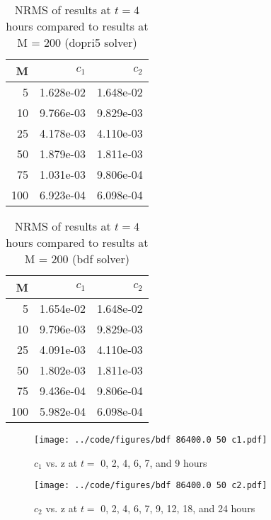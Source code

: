 \documentclass[twocolumn,10pt]{asme2ej}
\begin{document}
\begin{table}[tbh]
\begin{center}
\begin{tabular}{| r | r r |}
\hline
M & $c_{1}$ & $c_{2}$ \\
\hline
  5 & 1.628e-02 & 1.648e-02 \\
 10 & 9.766e-03 & 9.829e-03 \\
 25 & 4.178e-03 & 4.110e-03 \\
 50 & 1.879e-03 & 1.811e-03 \\
 75 & 1.031e-03 & 9.806e-04 \\
100 & 6.923e-04 & 6.098e-04 \\
\hline
\end{tabular}
\caption{NRMS of results at $t=4$ hours compared to results at M = 200 (dopri5 solver)}
\label{dopri5_nrms_table}
\end{center}
\end{table}

\begin{table}[tbh]
\begin{center}
\begin{tabular}{| r | r r |}
\hline
M & $c_{1}$ & $c_{2}$ \\
\hline
  5 & 1.654e-02 & 1.648e-02 \\
 10 & 9.796e-03 & 9.829e-03 \\
 25 & 4.091e-03 & 4.110e-03 \\
 50 & 1.802e-03 & 1.811e-03 \\
 75 & 9.436e-04 & 9.806e-04 \\
100 & 5.982e-04 & 6.098e-04 \\
\hline
\end{tabular}
\caption{NRMS of results at $t=4$ hours compared to results at M = 200 (bdf solver)}
\label{bdf_nrms_table}
\end{center}
\end{table}

\begin{figure}[thb]
\begin{center}
\texttt{[image: ../code/figures/bdf 86400.0 50 c1.pdf]}
\caption{$c_1$ vs. z at $t = $ 0, 2, 4, 6, 7, and 9 hours}
\label{c1_plot}
\end{center}
\end{figure}

\begin{figure}[thb]
\begin{center}
\texttt{[image: ../code/figures/bdf 86400.0 50 c2.pdf]}
\caption{$c_2$ vs. z at $t = $ 0, 2, 4, 6, 7, 9, 12, 18, and 24 hours}
\label{c2_plot}
\end{center}
\end{figure}
\end{document}
